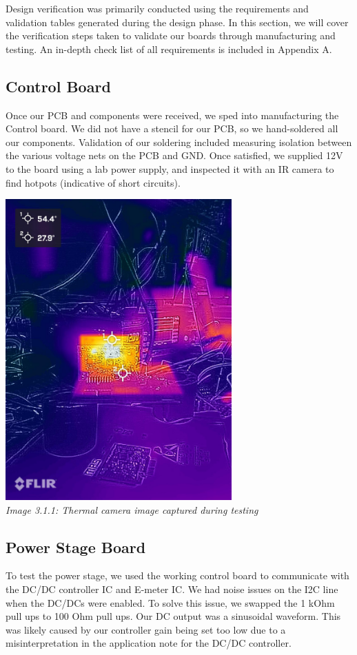 Design verification was primarily conducted using the requirements and validation tables generated during the design phase.
In this section, we will cover the verification steps taken to validate our boards through manufacturing and testing.
An in-depth check list of all requirements is included in Appendix A.

\subsection{Control Board}
Once our PCB and components were received, we sped into manufacturing the Control board.
We did not have a stencil for our PCB, so we hand-soldered all our components.
Validation of our soldering included measuring isolation between the various voltage nets on the PCB and GND.
Once satisfied, we supplied 12V to the board using a lab power supply, and inspected it with an IR camera to find hotpots (indicative of short circuits).

\begin{center}
    \includegraphics[width=0.65\textwidth]{images/thermal_camera_testing.jpg}\\
    \it Image 3.1.1: Thermal camera image captured during testing\\
\end{center}

\subsection{Power Stage Board}
To test the power stage, we used the working control board to communicate with the DC/DC controller IC and E-meter IC.
We had noise issues on the I2C line when the DC/DCs were enabled.
To solve this issue, we swapped the 1 kOhm pull ups to 100 Ohm pull ups.
Our DC output was a sinusoidal waveform.
This was likely caused by our controller gain being set too low due to a misinterpretation in the application note for the DC/DC controller.

